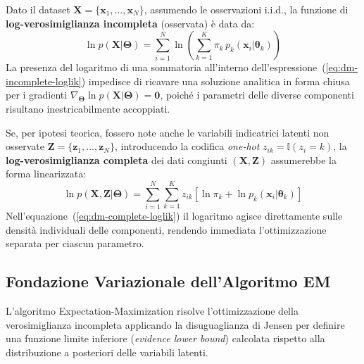 Dato il dataset $\mathbf{X} = \{\mathbf{x}_1, \dots, \mathbf{x}_N\}$, assumendo le osservazioni i.i.d., la funzione di \textbf{log-verosimiglianza incompleta} (osservata) è data da:
\begin{equation}
\label{eq:dm-incomplete-loglik}
\ln p(\mathbf{X} | \boldsymbol{\Theta}) = \sum_{i=1}^N \ln \left( \sum_{k=1}^K \pi_k \, p_k(\mathbf{x}_i | \boldsymbol{\theta}_k) \right)
\end{equation}
La presenza del logaritmo di una sommatoria all'interno dell'espressione~(\ref{eq:dm-incomplete-loglik}) impedisce di ricavare una soluzione analitica in forma chiusa per i gradienti $\nabla_{\boldsymbol{\Theta}} \ln p(\mathbf{X} | \boldsymbol{\Theta}) = \mathbf{0}$, poiché i parametri delle diverse componenti risultano inestricabilmente accoppiati.

Se, per ipotesi teorica, fossero note anche le variabili indicatrici latenti non osservate $\mathbf{Z} = \{\mathbf{z}_1, \dots, \mathbf{z}_N\}$, introducendo la codifica \textit{one-hot} $z_{ik} = \mathbb{I}(z_i = k)$, la \textbf{log-verosimiglianza completa} dei dati congiunti $(\mathbf{X}, \mathbf{Z})$ assumerebbe la forma linearizzata:
\begin{equation}
\label{eq:dm-complete-loglik}
\ln p(\mathbf{X}, \mathbf{Z} | \boldsymbol{\Theta}) = \sum_{i=1}^N \sum_{k=1}^K z_{ik} \left[ \ln \pi_k + \ln p_k(\mathbf{x}_i | \boldsymbol{\theta}_k) \right]
\end{equation}
Nell'equazione~(\ref{eq:dm-complete-loglik}) il logaritmo agisce direttamente sulle densità individuali delle componenti, rendendo immediata l'ottimizzazione separata per ciascun parametro.

\FloatBarrier
\subsection{Fondazione Variazionale dell'Algoritmo EM}

L'algoritmo Expectation-Maximization risolve l'ottimizzazione della verosimiglianza incompleta applicando la disuguaglianza di Jensen per definire una funzione limite inferiore (\textit{evidence lower bound}) calcolata rispetto alla distribuzione a posteriori delle variabili latenti.

